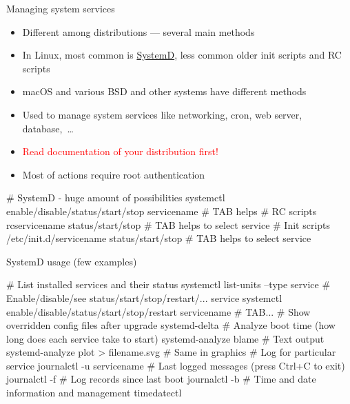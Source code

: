 \documentclass[compress, ucs, xelatex, 11pt, xcolor=svgnames, aspectratio=169,
	hyperref={
		bookmarks=true,
		unicode=true,
		colorlinks=true,
		pdftitle={Linux, command line and MetaCentrum},
		plainpages=false,
		pdfauthor={Vojtech Zeisek},
		pdfsubject={Course about use of Linux command line, writing shell scripts and using MetaCentrum of CESNET},
		pdfcreator={XeLaTeX},
		pdfkeywords={Linux, GNU, BASH, shell, command line, MetaCentrum},
		linkcolor=DarkRed, %
		anchorcolor=DarkBlue, %
		citecolor=Indigo, %
		filecolor=NavyBlue, %
		menucolor=DarkMagenta, %
		urlcolor=DarkBlue, %
		pdftex},
	url={hyphens, lowtilde} %
	]{beamer}
\renewcommand{\alert}[1]{\textcolor{red}{#1}}
\begin{document}
\begin{frame}[fragile]{Managing system services}
	\begin{itemize}
		\item Different among distributions --- several main methods
		\item In Linux, most common is \href{https://wiki.freedesktop.org/www/Software/systemd/}{SystemD}, less common older init scripts and RC scripts
		\item macOS and various BSD and other systems have different methods
		\item Used to manage system services like networking, cron, web server, database,~\ldots
		\item \alert{Read documentation of your distribution first!}
		\item Most of actions require root authentication
	\end{itemize}
	\vfill
	\begin{bashcode}
    # SystemD - huge amount of possibilities
    systemctl enable/disable/status/start/stop servicename # TAB helps
    # RC scripts
    rcservicename status/start/stop # TAB helps to select service
    # Init scripts
    /etc/init.d/servicename status/start/stop # TAB helps to select service
	\end{bashcode}
\end{frame}

\begin{frame}[fragile]{SystemD usage (few examples)}
	\begin{bashcode}
    # List installed services and their status
    systemctl list-units --type service
    # Enable/disable/see status/start/stop/restart/... service
    systemctl enable/disable/status/start/stop/restart servicename # TAB...
    # Show overridden config files after upgrade
    systemd-delta
    # Analyze boot time (how long does each service take to start)
    systemd-analyze blame # Text output
    systemd-analyze plot > filename.svg # Same in graphics
    # Log for particular service
    journalctl -u servicename
    # Last logged messages (press Ctrl+C to exit)
    journalctl -f
    # Log records since last boot
    journalctl -b
    # Time and date information and management
    timedatectl
	\end{bashcode}
\end{frame}

\end{document}
